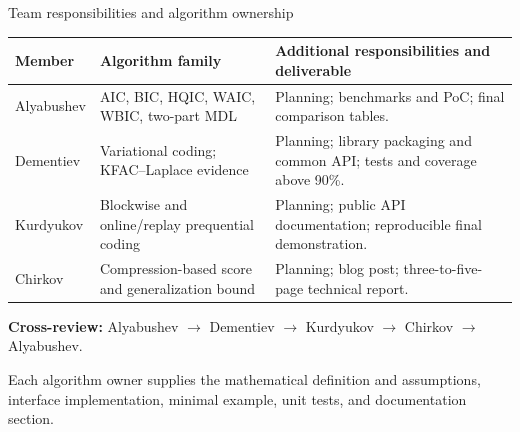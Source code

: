 \documentclass[aspectratio=169,notheorems]{beamer}
\begin{document}
\begin{frame}[shrink=5]{Team responsibilities and algorithm ownership}
\scriptsize
\renewcommand{\arraystretch}{1.20}
\begin{tabular}{@{}L{0.13\textwidth}L{0.28\textwidth}L{0.50\textwidth}@{}}
\toprule
\textbf{Member} & \textbf{Algorithm family} & \textbf{Additional responsibilities and deliverable} \\
\midrule
Alyabushev & AIC, BIC, HQIC, WAIC, WBIC, two-part MDL &
Planning; benchmarks and PoC; final comparison tables. \\
Dementiev & Variational coding; KFAC--Laplace evidence &
Planning; library packaging and common API; tests and coverage above 90\%. \\
Kurdyukov & Blockwise and online/replay prequential coding &
Planning; public API documentation; reproducible final demonstration. \\
Chirkov & Compression-based score and generalization bound &
Planning; blog post; three-to-five-page technical report. \\
\bottomrule
\end{tabular}

\medskip
\textbf{Cross-review:}
Alyabushev $\rightarrow$ Dementiev $\rightarrow$ Kurdyukov $\rightarrow$ Chirkov
$\rightarrow$ Alyabushev.

\medskip
Each algorithm owner supplies the mathematical definition and assumptions, interface
implementation, minimal example, unit tests, and documentation section.
\end{frame}
\end{document}
